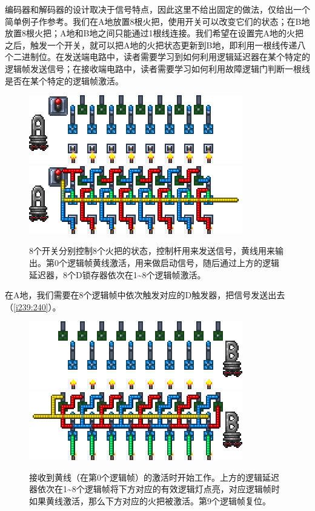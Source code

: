 编码器和解码器的设计取决于信号特点，因此这里不给出固定的做法，仅给出一个简单例子作参考。我们在A地放置8根火把，使用开关可以改变它们的状态；在B地放置8根火把；A地和B地之间只能通过1根线连接。我们希望在设置完A地的火把之后，触发一个开关，就可以把A地的火把状态更新到B地，即利用一根线传递八个二进制位。在发送端电路中，读者需要学习到如何利用逻辑延迟器在某个特定的逻辑帧发送信号；在接收端电路中，读者需要学习如何利用故障逻辑门判断一根线是否在某个特定的逻辑帧激活。

\begin{figure}[!ht]
\centering
\includegraphics{images/239.png}\qquad\includegraphics{images/240.png}
\caption{8个开关分别控制8个火把的状态，控制杆用来发送信号，黄线用来输出。第0个逻辑帧黄线激活，用来做启动信号，随后通过上方的逻辑延迟器，8个D锁存器依次在1\~{}8个逻辑帧激活。}
\label{i239:240}
\end{figure}

在A地，我们需要在8个逻辑帧中依次触发对应的D触发器，把信号发送出去（\autoref{i239:240}）。

\begin{figure}[!ht]
\centering
\includegraphics{images/241.png}\qquad\includegraphics{images/242.png}
\caption{接收到黄线（在第0个逻辑帧）的激活时开始工作。上方的逻辑延迟器依次在1\~{}8个逻辑帧将下方对应的有效逻辑灯点亮，对应逻辑帧时如果黄线激活，那么下方对应的火把被激活。第9个逻辑帧复位。}
\label{i241:242}
\end{figure}

